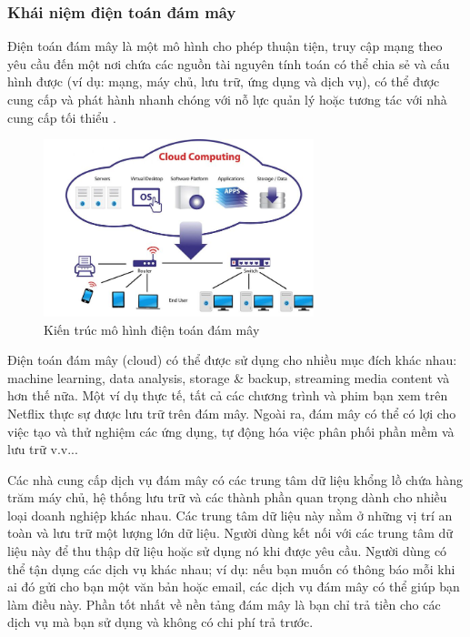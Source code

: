 \subsubsection{Khái niệm điện toán đám mây}
Điện toán đám mây là một mô hình cho phép thuận tiện, truy cập mạng theo yêu cầu đến một nơi chứa các nguồn tài nguyên tính toán có thể chia sẻ và cấu hình được (ví dụ: mạng, máy chủ, lưu trữ, ứng dụng và dịch vụ), có thể được cung cấp và phát hành nhanh chóng với nỗ lực quản lý hoặc tương tác với nhà cung cấp tối thiểu \cite{hostvn_cloud_computing}.
\begin{figure}[H] %
    \centering
    \includegraphics[width=0.7\textwidth]{Tong_quan_DTDM/dien-toan-dam-may-la-gi.jpg}
    \caption{Kiến trúc mô hình điện toán đám mây}
    \label{fig:cloud_intro}
\end{figure}

Điện toán đám mây (cloud) có thể được sử dụng cho nhiều mục đích khác nhau: machine learning, data analysis, storage \& backup, streaming media content và hơn thế nữa. Một ví dụ thực tế, tất cả các chương trình và phim bạn xem trên Netflix thực sự được lưu trữ trên đám mây. Ngoài ra, đám mây có thể có lợi cho việc tạo và thử nghiệm các ứng dụng, tự động hóa việc phân phối phần mềm và lưu trữ v.v..\cite{aws_cloud_file_storage}.

Các nhà cung cấp dịch vụ đám mây có các trung tâm dữ liệu khổng lồ chứa hàng trăm máy chủ, hệ thống lưu trữ và các thành phần quan trọng dành cho nhiều loại doanh nghiệp khác nhau. Các trung tâm dữ liệu này nằm ở những vị trí an toàn và lưu trữ một lượng lớn dữ liệu. Người dùng kết nối với các trung tâm dữ liệu này để thu thập dữ liệu hoặc sử dụng nó khi được yêu cầu. Người dùng có thể tận dụng các dịch vụ khác nhau; ví dụ: nếu bạn muốn có thông báo mỗi khi ai đó gửi cho bạn một văn bản hoặc email, các dịch vụ đám mây có thể giúp bạn làm điều này. Phần tốt nhất về nền tảng đám mây là bạn chỉ trả tiền cho các dịch vụ mà bạn sử dụng và không có chi phí trả trước.

